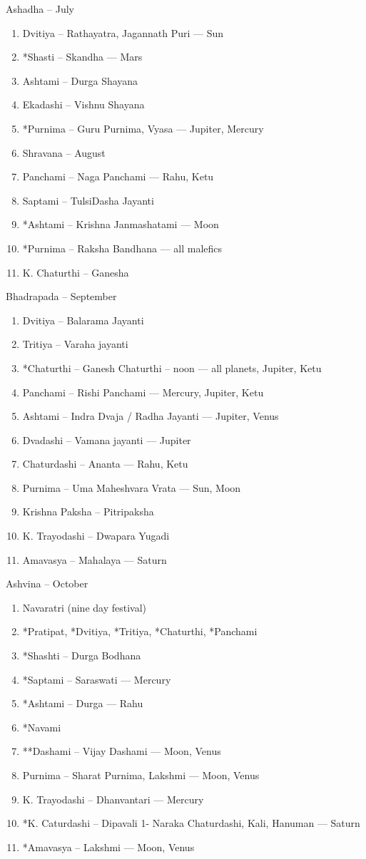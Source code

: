 \begin{enumerate}
\begin{enumerate}
Ashadha – July
\begin{enumerate} 
\item[] Dvitiya – Rathayatra, Jagannath Puri — Sun
\item[] *Shasti – Skandha — Mars
\item[] Ashtami – Durga Shayana
\item[] Ekadashi – Vishnu Shayana
\item[] *Purnima – Guru Purnima, Vyasa — Jupiter, Mercury
\item[] Shravana – August
\item[] Panchami – Naga Panchami — Rahu, Ketu
\item[] Saptami – TulsiDasha Jayanti
\item[] *Ashtami – Krishna Janmashatami — Moon
\item[] *Purnima – Raksha Bandhana — all malefics
\item[] K. Chaturthi – Ganesha
 \end{enumerate}

Bhadrapada – September
\begin{enumerate} 
\item[] Dvitiya – Balarama Jayanti
\item[] Tritiya – Varaha jayanti
\item[] *Chaturthi – Ganesh Chaturthi – noon — all planets, Jupiter, Ketu
\item[] Panchami – Rishi Panchami — Mercury, Jupiter, Ketu
\item[] Ashtami – Indra Dvaja / Radha Jayanti — Jupiter, Venus
\item[] Dvadashi – Vamana jayanti — Jupiter
\item[] Chaturdashi – Ananta — Rahu, Ketu
\item[] Purnima – Uma Maheshvara Vrata — Sun, Moon
\item[] Krishna  Paksha – Pitripaksha
\item[] K. Trayodashi – Dwapara Yugadi
\item[] Amavasya – Mahalaya — Saturn
 \end{enumerate}

Ashvina – October
\begin{enumerate} 
\item[] Navaratri (nine day festival)
\item[] *Pratipat, *Dvitiya, *Tritiya, *Chaturthi, *Panchami
\item[] *Shashti – Durga Bodhana
\item[] *Saptami – Saraswati — Mercury
\item[] *Ashtami – Durga — Rahu
\item[] *Navami
\item[] **Dashami – Vijay Dashami — Moon, Venus
\item[] Purnima – Sharat Purnima, Lakshmi — Moon, Venus
\item[] K. Trayodashi – Dhanvantari — Mercury
\item[] *K. Caturdashi – Dipavali 1- Naraka Chaturdashi, Kali, Hanuman — Saturn
\item[] *Amavasya – Lakshmi — Moon, Venus
 \end{enumerate}


\end{enumerate}
\end{enumerate}
